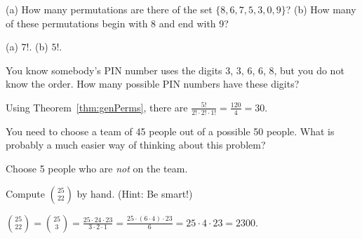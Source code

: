\begin{requ}
(a) How many permutations are there of the set $\{8, 6, 7, 5, 3, 0, 9\}$?
(b) How many of these permutations begin with 8 and end with 9?
\begin{requanswer}
(a) $7!$.
(b) $5!$.
\end{requanswer}
\end{requ}

\begin{requ}
You know somebody's PIN number uses the digits 3, 3, 6, 6, 8, but you do not know the order.
How many possible PIN numbers have these digits?
\begin{requanswer}
Using Theorem~\ref{thm:genPerms}, there are $\frac{5!}{2!\cdot 2!\cdot 1!} = \frac{120}{4}=30$.
\end{requanswer}
\end{requ}

\begin{requ}
You need to choose a team of 45 people out of a possible 50 people. 
What is probably a much easier way of thinking about this problem?
\begin{requanswer}
Choose 5 people who are {\em not} on the team.
\end{requanswer}
\end{requ}

\begin{requ}
Compute $\binom{25}{22}$ by hand. (Hint: Be smart!)
\begin{requanswer}
$\binom{25}{22} = \binom{25}{3}=\frac{25\cdot 24\cdot 23}{3\cdot 2\cdot 1} 
= \frac{25\cdot (6\cdot 4)\cdot 23}{6} = 25\cdot 4\cdot 23 = 2300$.
\end{requanswer}
\end{requ}

